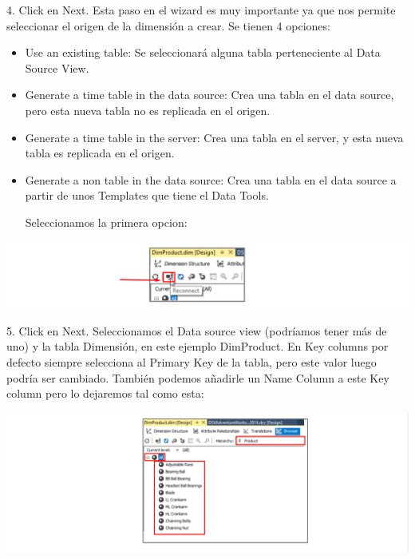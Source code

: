 4. Click en Next.
Esta paso en el wizard es muy importante ya que nos permite seleccionar el origen de la dimensión a crear.
Se tienen 4 opciones:
			\begin{itemize}
				\item Use an existing table: Se seleccionará alguna tabla perteneciente al Data Source View.
				\item Generate a time table in the data source: Crea una tabla en el data source, pero esta nueva tabla no
es replicada en el origen.
\item Generate a time table in the server: Crea una tabla en el server, y esta nueva tabla es replicada en
el origen.
\item Generate a non table in the data source: Crea una tabla en el data source a partir de unos
Templates que tiene el Data Tools.

Seleccionamos la primera opcion:

			\end{itemize}

	\begin{center}
	\includegraphics[width=\columnwidth]{images/task1/img4}
    \end{center}	

5. Click en Next.
Seleccionamos el Data source view (podríamos tener más de uno) y la tabla Dimensión, en este ejemplo
DimProduct. En Key columns por defecto siempre selecciona al Primary Key de la tabla, pero este valor luego
podría ser cambiado. También podemos añadirle un Name Column a este Key column pero lo dejaremos tal
como esta:
    
	\begin{center}
	\includegraphics[width=\columnwidth]{images/task1/img5}
    \end{center}	

